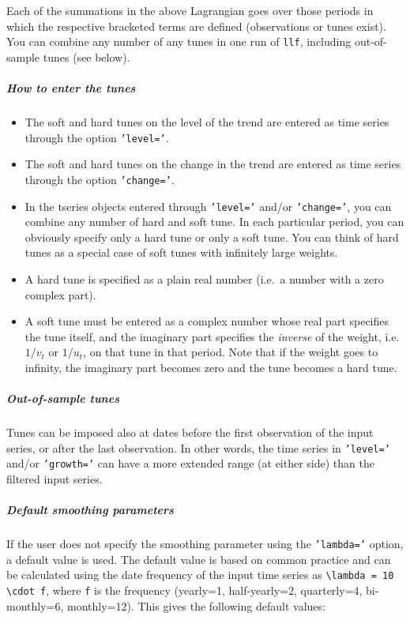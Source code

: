  Each of the summations in the above Lagrangian goes over those periods
 in which the respective bracketed terms are defined (observations or
 tunes exist). You can combine any number of any tunes in one run of
 \texttt{llf}, including out-of-sample tunes (see below).
 
 \subparagraph{How to enter the tunes}
 
 \begin{itemize}
 \item
   The soft and hard tunes on the level of the trend are entered as time
   series through the option \texttt{'level='}.
 \item
   The soft and hard tunes on the change in the trend are entered as time
   series through the option \texttt{'change='}.
 \item
   In the tseries objects entered through \texttt{'level='} and/or
   \texttt{'change='}, you can combine any number of hard and soft tune.
   In each particular period, you can obviously specify only a hard tune
   or only a soft tune. You can think of hard tunes as a special case of
   soft tunes with infinitely large weights.
 \item
   A hard tune is specified as a plain real number (i.e.~a number with a
   zero complex part).
 \item
   A soft tune must be entered as a complex number whose real part
   specifies the tune itself, and the imaginary part specifies the
   \emph{inverse} of the weight, i.e. $1/v_t$ or $1/u_t$, on that tune in
   that period. Note that if the weight goes to infinity, the imaginary
   part becomes zero and the tune becomes a hard tune.
 \end{itemize}
 
 \subparagraph{Out-of-sample tunes}
 
 Tunes can be imposed also at dates before the first observation of the
 input series, or after the last observation. In other words, the time
 series in \texttt{'level='} and/or \texttt{'growth='} can have a more
 extended range (at either side) than the filtered input series.
 
 \subparagraph{Default smoothing parameters}
 
 If the user does not specify the smoothing parameter using the
 \texttt{'lambda='} option, a default value is used. The default value is
 based on common practice and can be calculated using the date frequency
 of the input time series as
 \texttt{\textbackslash{}lambda = 10 \textbackslash{}cdot f}, where
 \texttt{f} is the frequency (yearly=1, half-yearly=2, quarterly=4,
 bi-monthly=6, monthly=12). This gives the following default values:
 
